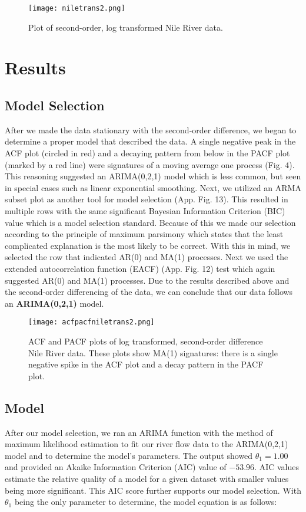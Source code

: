 \documentclass{article}
\begin{document}
\begin{figure}[H]
\begin{center}
\texttt{[image: niletrans2.png]}
\caption{Plot of second-order, log transformed Nile River data.}
\end{center}
\end{figure}


\section{Results}
\subsection{Model Selection}
After we made the data stationary with the second-order difference, we began to determine a proper model that described the data. A single negative peak in the ACF plot (circled in red) and a decaying pattern from below in the PACF plot (marked by a red line) were signatures of a moving average one process (Fig. 4). This reasoning suggested an ARIMA(0,2,1) model which is less common, but seen in special cases such as linear exponential smoothing\cite{nau}. Next, we utilized an ARMA subset plot as another tool for model selection (App. Fig. 13). This resulted in multiple rows with the same significant Bayesian Information Criterion (BIC) value which is a model selection standard. Because of this we made our selection according to the principle of maximum parsimony which states that the least complicated explanation is the most likely to be correct. With this in mind, we selected the row that indicated AR(0) and MA(1) processes. Next we used the extended autocorrelation function (EACF) (App. Fig. 12) test which again suggested AR(0) and MA(1) processes. Due to the results described above and the second-order differencing of the data, we can conclude that our data follows an \textbf{ARIMA(0,2,1)} model.

\begin{figure}[H]
\begin{center}
\texttt{[image: acfpacfniletrans2.png]}
\caption{ACF and PACF plots of log transformed, second-order difference Nile River data. These plots show MA(1) signatures: there is a single negative spike in the ACF plot and a decay pattern in the PACF plot.}
\end{center}
\end{figure}

\subsection{Model}
After our model selection, we ran an ARIMA function with the method of maximum likelihood estimation to fit our river flow data to the ARIMA(0,2,1) model and to determine the model's parameters. The output showed $\theta_{1} = 1.00$ and provided an Akaike Information Criterion (AIC) value of $-53.96$. AIC values estimate the relative quality of a model for a given dataset with smaller values being more significant. This AIC score further supports our model selection. With $\theta_{1}$ being the only parameter to determine, the model equation is as follows:
\end{document}
